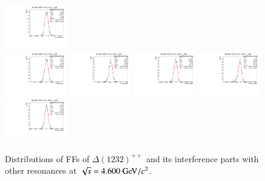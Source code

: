 \begin{figure}[htbp]
    \includegraphics[width=0.24\textwidth]{figure/app_ff/dataset_4600_fit_frac_res7_x_res0.pdf} \\
    \includegraphics[width=0.24\textwidth]{figure/app_ff/dataset_4600_fit_frac_res8_x_res0.pdf}
    \includegraphics[width=0.24\textwidth]{figure/app_ff/dataset_4600_fit_frac_res9_x_res0.pdf}
    \includegraphics[width=0.24\textwidth]{figure/app_ff/dataset_4600_fit_frac_res10_x_res0.pdf}
    \includegraphics[width=0.24\textwidth]{figure/app_ff/dataset_4600_fit_frac_res11_x_res0.pdf} \\
    \includegraphics[width=0.24\textwidth]{figure/app_ff/dataset_4600_fit_frac_res12_x_res0.pdf}

    \caption{Distributions of FFs of $\Delta(1232)^{++}$ and its interference parts with other resonances at $\sqrt{s} = 4.600\gev/c^2$.}
\label{fig:ff_delta1232}
\end{figure}

